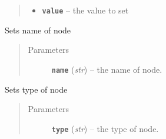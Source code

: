 \documentclass[letterpaper,10pt,english]{sphinxmanual}
\begin{document}
\begin{fulllineitems}
\begin{fulllineitems}
\begin{quote}
\begin{description}
\begin{itemize}
\item {} 
\textbf{\texttt{value}} -- the value to set

\end{itemize}

\end{description}\end{quote}

\end{fulllineitems}


\begin{fulllineitems}
\label{zBuilder.nodes:zBuilder.nodes.base.BaseNode.set_attrs}
\end{fulllineitems}


\begin{fulllineitems}
\label{zBuilder.nodes:zBuilder.nodes.base.BaseNode.set_maps}
\end{fulllineitems}


\begin{fulllineitems}
\label{zBuilder.nodes:zBuilder.nodes.base.BaseNode.set_name}
Sets name of node
\begin{quote}\begin{description}
\item[{Parameters}] \leavevmode
\textbf{\texttt{name}} (\emph{str}) -- the name of node.

\end{description}\end{quote}

\end{fulllineitems}


\begin{fulllineitems}
\label{zBuilder.nodes:zBuilder.nodes.base.BaseNode.set_type}
Sets type of node
\begin{quote}\begin{description}
\item[{Parameters}] \leavevmode
\textbf{\texttt{type}} (\emph{str}) -- the type of node.


\end{description}
\end{quote}
\end{fulllineitems}
\end{fulllineitems}
\end{document}
